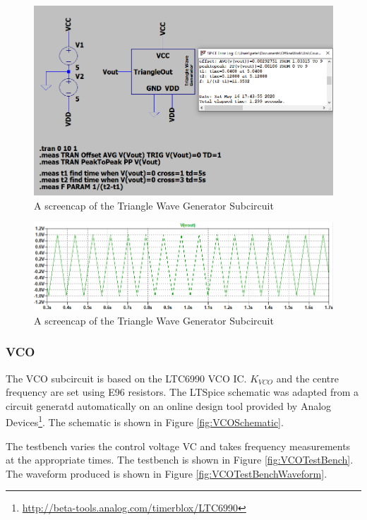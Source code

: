 \begin{figure}[H]
    \centering 
    \includegraphics[width=\textwidth]{../Circuits/Images/TriangleWaveGenerator/TestBenchScreencap}
    \caption{A screencap of the Triangle Wave Generator Subcircuit}
    \label{fig:triangleWaveGeneratorTestBench}
\end{figure}

\begin{figure}[H]
    \centering 
    \includegraphics[width=\textwidth]{../Circuits/Images/TriangleWaveGenerator/OutputWaveform}
    \caption{A screencap of the Triangle Wave Generator Subcircuit}
    \label{fig:triangleWaveGeneratorWaveform}
\end{figure}

\subsubsection{VCO}
The VCO subcircuit is based on the LTC6990 VCO IC. 
$K_{VCO}$ and the centre frequency are set using E96 resistors.
The LTSpice schematic was adapted from a circuit generatd automatically on an online design tool provided by Analog Devices\footnote{\url{http://beta-tools.analog.com/timerblox/LTC6990}}.
The schematic is shown in Figure \ref{fig:VCOSchematic}.

The testbench varies the control voltage VC and takes frequency measurements at the appropriate times. 
The testbench is shown in Figure \ref{fig:VCOTestBench}.
The waveform produced is shown in Figure \ref{fig:VCOTestBenchWaveform}.

